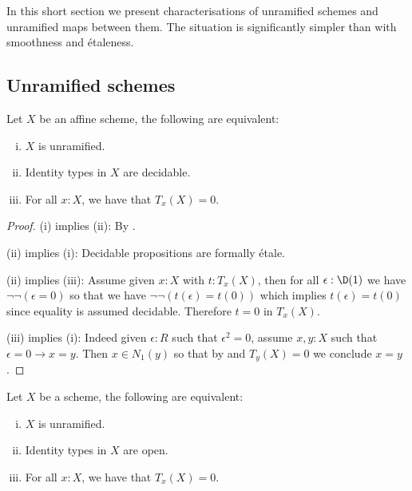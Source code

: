 \label{unramified-characterisation}
In this short section we present characterisations of unramified schemes and unramified maps between them. The situation is significantly simpler than with smoothness and étaleness.

\subsection{Unramified schemes}

\begin{lemma}\label{unramified-affine-characterisation}
Let $X$ be an affine scheme, the following are equivalent:
\begin{enumerate}[(i)]
\item $X$ is unramified.
\item Identity types in $X$ are decidable.
\item For all $x:X$, we have that $T_x(X)=0$.
\end{enumerate}
\end{lemma}

\begin{proof}
(i) implies (ii): By .

(ii) implies (i): Decidable propositions are formally étale.

(ii) implies (iii): Assume given $x:X$ with $t:T_x(X)$, then for all $\epsilon:\D(1)$ we have $\neg\neg(\epsilon = 0)$ so that we have $\neg\neg (t(\epsilon) = t(0))$ which implies $t(\epsilon) = t(0)$ since equality is assumed decidable. Therefore $t = 0$ in $T_x(X)$.

(iii) implies (i): Indeed given $\epsilon:R$ such that $\epsilon^2=0$, assume $x,y:X$ such that $\epsilon=0 \to x=y$. Then $x\in N_1(y)$ so that by  and $T_y(X)=0$ we conclude $x=y$.
\end{proof}

\begin{corollary}\label{unramified-scheme-characterisation}
Let $X$ be a scheme, the following are equivalent:
\begin{enumerate}[(i)]
\item $X$ is unramified.
\item Identity types in $X$ are open.
\item For all $x:X$, we have that $T_x(X)=0$.
\end{enumerate}
\end{corollary}

